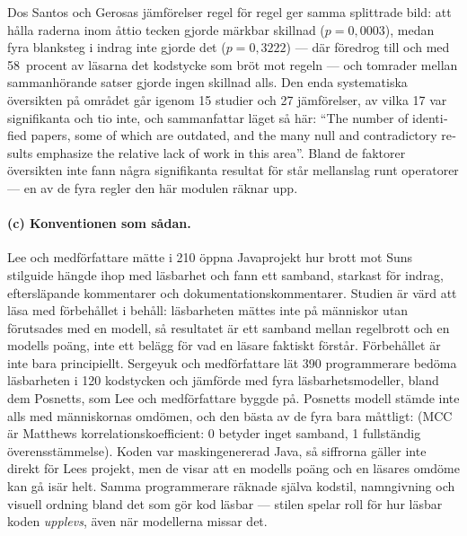 Dos Santos och Gerosas jämförelser regel för regel ger samma splittrade
bild: att hålla raderna inom åttio tecken gjorde märkbar skillnad
($p = 0{,}0003$), medan fyra blanksteg i indrag inte gjorde det
($p = 0{,}3222$) --- där föredrog till och med 58~procent av läsarna
det kodstycke som bröt mot regeln --- och tomrader mellan
sammanhörande satser gjorde ingen skillnad
alls\autocite[avsnitt~4.2]{SantosGerosa2018Readability}.  Den enda
systematiska översikten på området går igenom 15 studier och
27 jämförelser, av vilka 17 var signifikanta och tio inte, och
sammanfattar läget så här: \enquote{\foreignlanguage{english}{The number
of identified papers, some of which are outdated, and the many null and
contradictory results emphasize the relative lack of work in this
area}}\autocite[sammanfattningen]{Oliveira2023FormattingSLR}.  Bland de
faktorer översikten inte fann några signifikanta resultat för står
mellanslag runt operatorer --- en av de fyra regler den här modulen
räknar upp.

\paragraph{(c) Konventionen som sådan.}  Lee och medförfattare mätte i
210 öppna Javaprojekt hur brott mot Suns stilguide hängde ihop med
läsbarhet och fann ett samband, starkast för indrag, eftersläpande
kommentarer och
dokumentationskommentarer\autocite[avsnitt~7]{Lee2015ConventionViolations}.
Studien är värd att läsa med förbehållet i behåll: läsbarheten mättes
inte på människor utan förutsades med en modell, så resultatet är ett
samband mellan regelbrott och en modells poäng, inte ett belägg för vad
en läsare faktiskt förstår.  Förbehållet är inte bara principiellt.
Sergeyuk och medförfattare lät 390 programmerare bedöma läsbarheten i
120 kodstycken och jämförde med fyra läsbarhetsmodeller, bland dem
Posnetts, som Lee och medförfattare byggde på.  Posnetts modell stämde
inte alls med människornas omdömen, och den bästa av de fyra bara
måttligt:  (MCC är Matthews korrelationskoefficient: 0 betyder inget
samband, 1 fullständig överensstämmelse).  Koden var maskingenererad Java, så siffrorna gäller inte
direkt för Lees projekt, men de visar att en modells poäng och en
läsares omdöme kan gå isär helt.  Samma programmerare räknade själva
kodstil, namngivning och visuell ordning bland det som gör kod
läsbar\autocite[avsnitt~6]{Sergeyuk2024Readability} --- stilen spelar
roll för hur läsbar koden \emph{upplevs}, även när modellerna missar
det.

